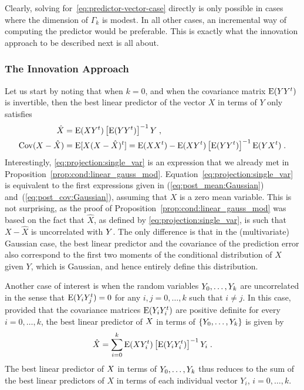 Clearly, solving for~\eqref{eq:predictor-vector-case} directly is only possible
in cases where the dimension of $\Gamma_k$ is modest. In all other
cases, an incremental way of computing the predictor would be preferable.
This is exactly what the innovation approach to be described next is all about.


\subsubsection{The Innovation Approach}
Let us start by noting that when $k=0$, and when the covariance matrix
$\operatorname{E}(Y Y^t)$ is invertible, then the best linear predictor of the vector $X$
  in terms of $Y$ only satisfies
\begin{align}
  \hat{X} & = \operatorname{E}(X Y^t) \left[\operatorname{E}(Y Y^t)\right]^{-1} Y \; ,    \label{eq:projection:single_var} \\
  \operatorname{Cov}(X-\hat{X}) & = \operatorname{E}[X(X-\hat{X})^t] = \operatorname{E}(X X^t) - \operatorname{E}(X Y^t) \left[\operatorname{E}(Y Y^t)\right]^{-1}\operatorname{E}(Y X^t)  \; . \nonumber
\end{align}
Interestingly, \eqref{eq:projection:single_var} is an expression that we
already met in Proposition~\ref{prop:cond:linear_gauss_mod}.
Equation~\eqref{eq:projection:single_var} is equivalent to the first expressions given
in (\ref{eq:post_mean:Gaussian}) and~(\ref{eq:post_cov:Gaussian}),
assuming that $X$ is a zero mean variable. This is not surprising, as the
proof of Proposition~\ref{prop:cond:linear_gauss_mod} was based on the fact
that $\hat{X}$, as defined by \eqref{eq:projection:single_var}, is such that
$X-\hat{X}$ is uncorrelated with $Y$. The only difference is that in the
(multivariate) Gaussian case, the best linear predictor and the covariance of the prediction
error also correspond to the first two moments of the conditional distribution
of $X$ given $Y$, which is Gaussian, and hence entirely define this distribution.

Another case of interest is when the random variables $Y_0, \ldots, Y_k$ are uncorrelated in the sense that $\operatorname{E}(Y_i Y_j^t)=0$ for any $i,j=0, \dotsc, k$ such that $i \ne j$.
In this case, provided that the covariance matrices $\operatorname{E}(Y_i Y_i^t)$ are positive definite for every $i=0, \ldots, k$, the
best linear predictor of $X$ in terms of $\{Y_0, \ldots, Y_k\}$ is given by
\begin{equation}
\label{eq:predictor-vector-case-uncorrelated}
\hat{X} = \sum_{i=0}^k \operatorname{E}(X Y_i^t) \left[ \operatorname{E}(Y_i Y_i^t) \right]^{-1} Y_i \; .
\end{equation}
The best linear predictor of $X$ in terms of $Y_0, \ldots, Y_k$ thus reduces
to the sum of the best linear predictors of $X$ in terms of each individual
vector $Y_i$, $i=0, \dotsc, k$.

